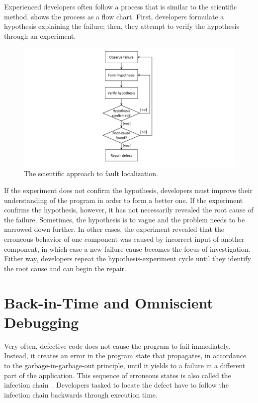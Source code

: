 Experienced developers often follow a process that is similar to the scientific method.
 shows the process as a flow chart.
First, developers formulate a hypothesis explaining the failure; then, they attempt to verify the hypothesis through an experiment. 
\begin{figure}[th]
\centering
\includegraphics[width=.4\linewidth]{img/workflow-scientific-method}
\caption{The scientific approach to fault localization.}
\label{fig:scientifiy-method}
\end{figure}
If the experiment does not confirm the hypothesis, developers must improve their understanding of the program in order to form a better one.
If the experiment confirms the hypothesis, however, it has not necessarily revealed the root cause of the failure.
Sometimes, the hypothesis is to vague and the problem needs to be narrowed down further.
In other cases, the experiment revealed that the erroneous behavior of one component was caused by incorrect input of another component, in which case a new failure cause becomes the focus of investigation.
Either way, developers repeat the hypothesis-experiment cycle until they identify the root cause and can begin the repair.

\section{Back-in-Time and Omniscient Debugging}

Very often, defective code does not cause the program to fail immediately.
Instead, it creates an error in the program state that propagates, in accordance to the garbage-in-garbage-out principle, until it yields to a failure in a different part of the application.
This sequence of erroneous states is also called the infection chain~\cite{zeller09:why_programs_fail}.
Developers tasked to locate the defect have to follow the infection chain backwards through execution time.


